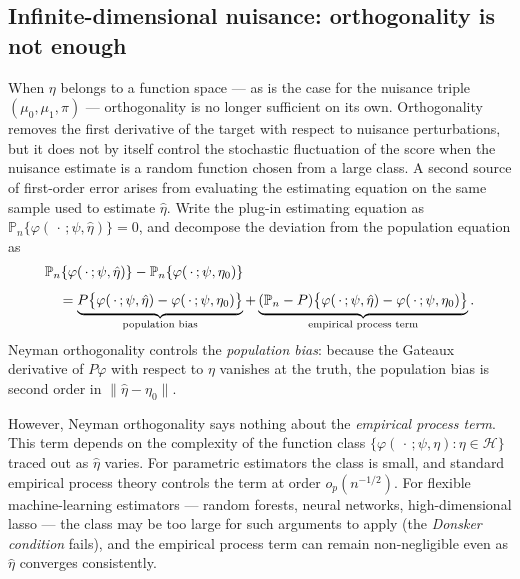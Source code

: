 \documentclass[master.tex]{subfiles}
\begin{document}
\subsection{Infinite-dimensional nuisance: orthogonality is not enough}
\label{w11:subsec:infinite-dim}

When $\eta$ belongs to a function space — as is the case for the
nuisance triple $(\mu_0, \mu_1, \pi)$ — orthogonality is no longer
sufficient on its own.  Orthogonality removes the first derivative
of the target with respect to nuisance perturbations, but it does
not by itself control the stochastic fluctuation of the score when
the nuisance estimate is a random function chosen from a large
class.  A second source of first-order error arises from evaluating
the estimating equation on the same sample used to estimate
$\hat\eta$.  Write the
plug-in estimating equation as
$\mathbb{P}_n\{\varphi(\,\cdot\,;\psi, \hat\eta)\} = 0$, and
decompose the deviation from the population equation as
\begin{align}
  &\mathbb{P}_n\{\varphi(\,\cdot\,;\psi, \hat\eta)\}
  -
  \mathbb{P}_n\{\varphi(\,\cdot\,;\psi, \eta_0)\}
  \nonumber\\[4pt]
  &\quad=
  \underbrace{%
    P\bigl\{\varphi(\,\cdot\,;\psi,\hat\eta)
       - \varphi(\,\cdot\,;\psi,\eta_0)\bigr\}
  }_{\text{population bias}}
  +
  \underbrace{%
    (\mathbb{P}_n - P)\bigl\{\varphi(\,\cdot\,;\psi,\hat\eta)
                        - \varphi(\,\cdot\,;\psi,\eta_0)\bigr\}
  }_{\text{empirical process term}}.
  \label{w11:eq:decomp}
\end{align}
Neyman orthogonality controls the \emph{population bias}: because
the Gateaux derivative of $P\varphi$ with respect to $\eta$
vanishes at the truth, the population bias is second order in
$\|\hat\eta - \eta_0\|$.

However, Neyman orthogonality says nothing about the
\emph{empirical process term}.  This term depends on the
complexity of the function class
$\{\varphi(\,\cdot\,;\psi,\eta) : \eta \in \mathcal{H}\}$
traced out as $\hat\eta$ varies.  For parametric estimators the
class is small, and standard empirical process theory controls
the term at order $o_p(n^{-1/2})$.  For flexible machine-learning
estimators — random forests, neural networks, high-dimensional
lasso — the class may be too large for such arguments to apply
(the \emph{Donsker condition} fails), and the empirical process
term can remain non-negligible even as $\hat\eta$ converges
consistently.
\end{document}
